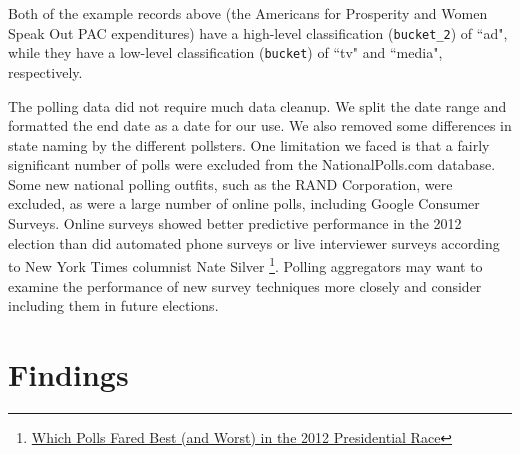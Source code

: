 \documentclass[11pt]{article}\usepackage{graphicx, color}
\begin{document}
Both of the example records above (the Americans for Prosperity and Women Speak Out PAC expenditures) have a high-level classification (\texttt{bucket\_2}) of ``ad", while they have a low-level classification (\texttt{bucket}) of ``tv" and ``media", respectively.

The polling data did not require much data cleanup. We split the date range and formatted the end date as a date for our use. We also removed some differences in state naming by the different pollsters. One limitation we faced is that a fairly significant number of polls were excluded from the NationalPolls.com database. Some new national polling outfits, such as the RAND Corporation, were excluded, as were a large number of online polls, including Google Consumer Surveys. Online surveys showed better predictive performance in the 2012 election than did automated phone surveys or live interviewer surveys according to New York Times columnist Nate Silver \footnote{\href{http://fivethirtyeight.blogs.nytimes.com/2012/11/10/which-polls-fared-best-and-worst-in-the-2012-presidential-race/}{Which Polls Fared Best (and Worst) in the 2012 Presidential Race}}. Polling aggregators may want to examine the performance of new survey techniques more closely and consider including them in future elections.


\section{Findings}
% 
\end{document}
